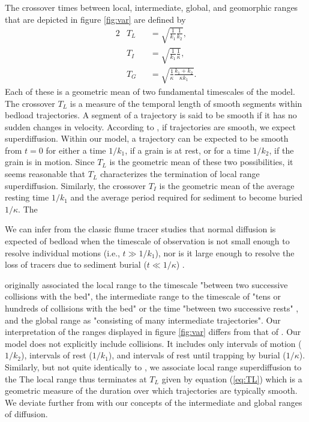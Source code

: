 \documentclass[]{agujournal2018}
\begin{document}
The crossover times between local, intermediate, global, and geomorphic ranges that are depicted in figure \ref{fig:var} are defined by
\begin{alignat}{2}
&T_L &&= \sqrt{\frac{1}{k_1}\frac{1}{k_2}}, \label{eq:TL}\\
&T_I &&= \sqrt{\frac{1}{k_1}\frac{1}{\kappa}},\label{eq:TI}\\
&T_G &&= \sqrt{\frac{1}{\kappa}\frac{k_1+k_2}{\kappa k_1}} \label{eq:TG}.
\end{alignat}
Each of these is a geometric mean of two fundamental timescales of the model.
The crossover $T_L$ is a measure of the temporal length of smooth segments within bedload trajectories.
A segment of a trajectory is said to be smooth if it has no sudden changes in velocity.
According to \citet{Nikora2002}, if trajectories are smooth, we expect superdiffusion.
Within our model, a trajectory can be expected to be smooth from $t=0$ for either a time $1/k_1$, if a grain is at rest, or for a time $1/k_2$, if the grain is in motion.
Since $T_L$ is the geometric mean of these two possibilities, it seems reasonable that $T_L$ characterizes the termination of local range superdiffusion.
Similarly, the crossover $T_I$ is the geometric mean of the average resting time $1/k_1$ and the average period required for sediment to become buried $1/\kappa$.
The 




We can infer from the classic flume tracer studies that normal diffusion is expected of bedload when the timescale of observation is not small enough to resolve individual motions (i.e., $t\gg1/k_1$), nor is it large enough to resolve the loss of tracers due to sediment burial ($t\ll1/\kappa$) \citep{Einstein1937, Einstein1942, Yano1969, Nakagawa1976}.










\citet{Nikora2002} originally associated the local range to the timescale "between two successive collisions with the bed", the intermediate range to the timescale of "tens or hundreds of collisions with the bed" or the time "between two successive rests" , and the global range as "consisting of many intermediate trajectories".
Our interpretation of the ranges displayed in figure \ref{fig:var} differs from that of \citet{Nikora2002}.
Our model does not explicitly include collisions. It includes only intervals of motion ($1/k_2$), intervals of rest ($1/k_1$), and intervals of rest until trapping by burial ($1/\kappa$).
Similarly, but not quite identically to \citet{Nikora2002}, we associate local range superdiffusion to the 
The local range thus terminates at $T_L$ given by equation (\ref{eq:TL}) which is a geometric measure of the duration over which trajectories are typically smooth.
We deviate further from \citet{Nikora2002} with our concepts of the intermediate and global ranges of diffusion.
\end{document}
